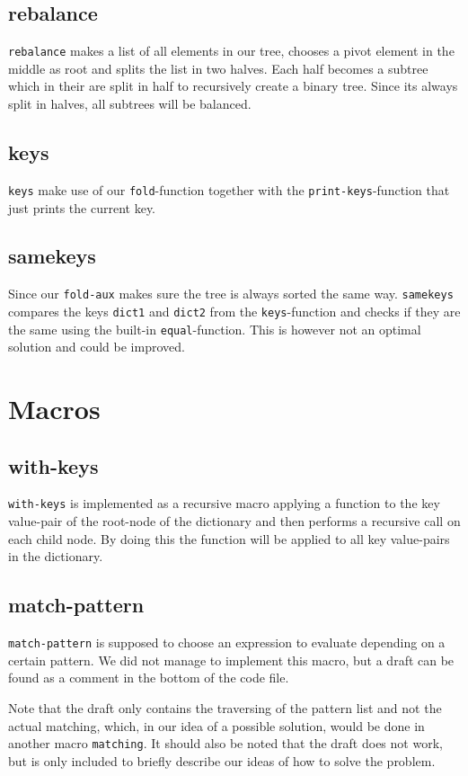 \documentclass[a4paper,11pt]{article}
\begin{document}
\subsection{rebalance}
\texttt{rebalance} makes a list of all elements in our tree, chooses a pivot element in the middle as root and splits the list in two halves. Each half becomes a subtree which in their are split in half to recursively create a binary tree. Since its always split in halves, all subtrees will be balanced.

\subsection{keys}
\texttt{keys} make use of our \texttt{fold}-function together with the \texttt{print-keys}-function that just prints the current key.

\subsection{samekeys}
Since our \texttt{fold-aux} makes sure the tree is always sorted the same way. \texttt{samekeys} compares the keys \texttt{dict1} and \texttt{dict2} from the \texttt{keys}-function and checks if they are the same using the built-in \texttt{equal}-function. This is however not an optimal solution and could be improved.

\section{Macros}

\subsection{with-keys}
\texttt{with-keys} is implemented as a recursive macro applying a function to the key value-pair of the root-node of the dictionary and then performs a recursive call on each child node. By doing this the function will be applied to all key value-pairs in the dictionary.

\subsection{match-pattern}
\texttt{match-pattern} is supposed to choose an expression to evaluate depending on a certain pattern. We did not manage to implement this macro, but a draft can be found as a comment in the bottom of the code file.

Note that the draft only contains the traversing of the pattern list and not the actual matching, which, in our idea of a possible solution, would be done in another macro \texttt{matching}. It should also be noted that the draft does not work, but is only included to briefly describe our ideas of how to solve the problem.
\end{document}
